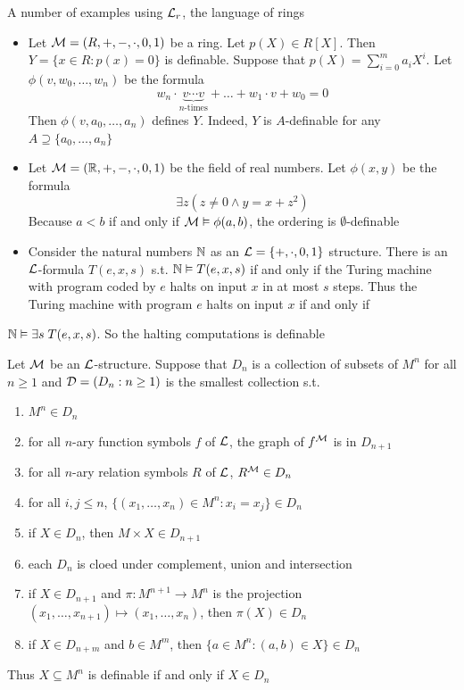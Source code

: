 \documentclass[11pt]{article}
\begin{document}
A number of examples using \(\mathcal{L}_r\), the language of rings
\begin{itemize}
\item Let \(\mathcal{M}=(R,+,-,\cdot,0,1)\) be a ring. Let \(p(X)\in R[X]\). Then 
\(Y=\{x\in R:p(x)=0\}\) is definable. Suppose that
\(p(X)=\displaystyle\sum_{i=0}^ma_iX^i\). Let \(\phi(v,w_0,\dots,w_n)\) be the
formula
\begin{equation*}
w_n\cdot\underbrace{v\cdots v}_{n\text{-times}}+\dots+w_1\cdot v+w_0=0
\end{equation*}
Then \(\phi(v,a_0,\dots,a_n)\) defines \(Y\). Indeed, \(Y\) is \(A\)-definable
for any \(A\supseteq\{a_0,\dots,a_n\}\)
\item Let \(\mathcal{M}=(\mathbb{R},+,-,\cdot,0,1)\) be the field of real numbers. Let
\(\phi(x,y)\) be the formula 
\begin{equation*}
\exists z(z\neq 0\wedge y=x+z^2)
\end{equation*}
Because \(a<b\) if and only if \(\mathcal{M}\vDash\phi(a,b)\), the ordering is
\(\emptyset\)-definable
\item Consider the natural numbers \(\mathbb{N}\) as an \(\mathcal{L}=\{+,\cdot,0,1\}\) structure.
There is an \(\mathcal{L}\)-formula \(T(e,x,s)\) s.t. \(\mathbb{N}\vDash T(e,x,s)\) if and
only if the Turing machine with program coded by \(e\) halts on input \(x\) in
at most \(s\) steps. Thus the Turing machine with program \(e\) halts on input
\(x\) if and only if
\end{itemize}

\(\mathbb{N}\vDash\exists s\;T(e,x,s)\). So the halting
    computations is definable


\begin{proposition}[]
Let \(\mathcal{M}\) be an \(\mathcal{L}\)-structure. Suppose that \(D_n\) is a collection of
subsets of \(M^n\) for all \(n\ge 1\) and \(\mathcal{D}=(D_n:n\ge 1)\) is the smallest
collection s.t. 
\begin{enumerate}
\item \(M^n\in D_n\)
\item for all \(n\)-ary function symbols \(f\) of \(\mathcal{L}\), the graph of \(f^{\mathcal{M}}\)
is in \(D_{n+1}\)
\item for all \(n\)-ary relation symbols \(R\) of \(\mathcal{L}\), \(R^{\mathcal{M}}\in D_n\)
\item for all \(i,j\le n\), \(\{(x_1,\dots,x_n)\in M^n:x_i=x_j\}\in D_n\)
\item if \(X\in D_n\), then \(M\times X\in D_{n+1}\)
\item each \(D_n\) is cloed under complement, union and intersection
\item if \(X\in D_{n+1}\) and \(\pi:M^{n+1}\to M^n\) is the projection 
\((x_1,\dots,x_{n+1})\mapsto(x_1,\dots,x_n)\), then \(\pi(X)\in D_n\)
\item if \(X\in D_{n+m}\) and \(b\in M^m\), then \(\{a\in M^n:(a,b)\in X\}\in D_n\)
\end{enumerate}


Thus \(X\subseteq M^n\) is definable if and only if \(X\in D_n\)
\end{proposition}
\end{document}
